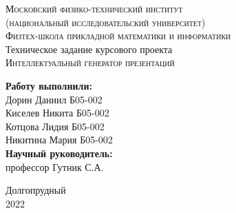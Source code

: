 



  \begin{titlepage}	%

    \thispagestyle{empty}
    \begin{center}		%
      \textsc{Московский физико-технический институт} \\
      \textsc{(национальный исследовательский университет)} \\
      \textsc{Физтех-школа прикладной математики и информатики} \\[6cm]

      \large Техническое задание курсового проекта \\
      \huge \textsc{Интеллектуальный генератор презентаций} \\ 
    \end{center}

    \vfill

    \begin{flushright} %
      \begin{minipage}{0.45\textwidth} %
        \begin{flushleft} %

          \large\textbf{Работу выполнили:}\\
          \large Дорин Даниил Б05-002 \\
          \large Киселев Никита Б05-002 \\
          \large Котцова Лидия Б05-002 \\
          \large Никитина Мария Б05-002 \\

          \large \textbf{Научный руководитель:}\\
          \large профессор Гутник С.А.

        \end{flushleft}
      \end{minipage}
    \end{flushright}

    \vfill %

    \begin{center}
      \large Долгопрудный \\
      \large 2022 %
    \end{center} %

    \pagebreak

  \end{titlepage} %
  \newpage

